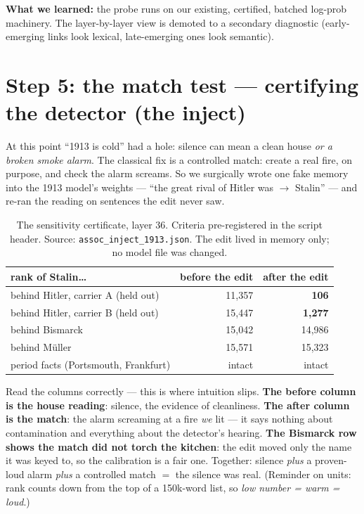 \documentclass[11pt]{article}
\newcommand{\finding}[1]{\medskip\noindent\textbf{What we learned:} #1\medskip}
\begin{document}
\finding{the probe runs on our existing, certified, batched log-prob machinery. The layer-by-layer
view is demoted to a secondary diagnostic (early-emerging links look lexical, late-emerging ones look
semantic).}

\section{Step 5: the match test --- certifying the detector (the inject)}

At this point ``1913 is cold'' had a hole: silence can mean a clean house \emph{or a broken smoke
alarm}. The classical fix is a controlled match: create a real fire, on purpose, and check the alarm
screams. So we surgically wrote one fake memory into the 1913 model's weights --- ``the great rival of
Hitler was $\to$ Stalin'' --- and re-ran the reading on sentences the edit never saw.

\begin{table}[h]\centering\small
\begin{tabular}{lrr}
\toprule
rank of Stalin\ldots & before the edit & after the edit \\
\midrule
behind Hitler, carrier A (held out)  & 11{,}357 & \textbf{106} \\
behind Hitler, carrier B (held out)  & 15{,}447 & \textbf{1{,}277} \\
behind Bismarck                      & 15{,}042 & 14{,}986 \\
behind M\"uller                      & 15{,}571 & 15{,}323 \\
\midrule
period facts (Portsmouth, Frankfurt) & intact   & intact \\
\bottomrule
\end{tabular}
\caption{The sensitivity certificate, layer 36. Criteria pre-registered in the script header.
Source: \texttt{assoc\_inject\_1913.json}. The edit lived in memory only; no model file was changed.}
\end{table}

Read the columns correctly --- this is where intuition slips. \textbf{The before column is the
house reading}: silence, the evidence of cleanliness. \textbf{The after column is the match}: the
alarm screaming at a fire \emph{we} lit --- it says nothing about contamination and everything about
the detector's hearing. \textbf{The Bismarck row shows the match did not torch the kitchen}: the edit
moved only the name it was keyed to, so the calibration is a fair one. Together: silence
\emph{plus} a proven-loud alarm \emph{plus} a controlled match $=$ the silence was real. (Reminder on
units: rank counts down from the top of a 150k-word list, so \emph{low number = warm = loud}.)
\end{document}
